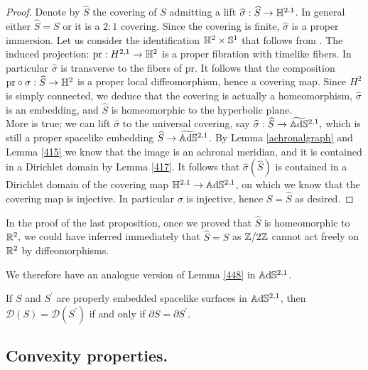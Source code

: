 \begin{proof}

    Denote by $\widehat{S}$ the covering of $S$ admitting a lift $\widehat{\sigma}:\widehat{S}\to\mathbb{H}^{2.1}$. In general either $\widehat{S}=S$ or it is a $2:1$ covering. Since the covering is finite, $\widehat{\sigma}$ is a proper immersion. Let us consider the identification $\mathbb{H}^2\times\mathbb{S}^1$ that follows from . The induced projection: $\text{pr}:H^{2,1}\to\mathbb{H}^2$ is a proper fibration with timelike fibers. In particular $\widehat{\sigma}$ is transverse to the fibers of $\text{pr}.$ It follows that the composition $\text{pr}\circ\sigma:\widehat{S}\to\mathbb{H}^2$ is a proper local diffeomorphism, hence a covering map. Since $H^2$ is simply connected, we deduce that the covering is actually a homeomorphism, $\widehat{\sigma}$ is an embedding, and $\widehat{S}$ is homeomorphic to the hyperbolic plane. \\
    More is true; we can lift $\widehat{\sigma}$ to the universal covering, say $\widehat{\sigma}:\widehat{S}\to\widetilde{\mathbb{A}\mathrm{d}\mathbb{S}}{}^{2,1},$ which is still a proper spacelike embedding $\widehat{S}\to \widetilde{\mathbb{A}\mathrm{d}\mathbb{S}}{}^{2,1}$. By Lemma \ref{achronalgraph} and Lemma \ref{415} we know that the image is an achronal meridian, and it is contained in a Dirichlet domain by Lemma \ref{417}. It follows that $\widehat{\sigma}(\widehat{S})$ is contained in a Dirichlet domain of the covering map $\mathbb{H}^{2,1}\to\mathbb{A}\mathrm{d}\mathbb{S}^{2,1}$, on which we know that the covering map is injective. In particular $\sigma$ is injective, hence $S=\widehat{S}$ as desired.  
\end{proof}

\begin{observation}
    In the proof of the last proposition, once we proved that $\hat{S}$ is homeomorphic to $\mathbb{R}^2,$ we could have inferred immediately that $\hat{S}=S$ as $\mathbb{Z}/2\mathbb{Z}$ cannot act freely on $\mathbb{R}^2$ by diffeomorphisms. 
\end{observation}

We therefore have an analogue version of Lemma \ref{448} in $\mathbb{A}\mathrm{d}\mathbb{S}^{2,1}$.

\begin{corollary}
    If $S$ and $S^{\prime}$ are properly embedded spacelike surfaces in $\mathbb{A}\mathrm{d}\mathbb{S}^{2,1}$, then $\mathcal{D}(S)=\mathcal{D}(S^{\prime})$ if and only if $\partial S=\partial S^{\prime}$. 
\end{corollary}

\subsection{Convexity properties.}

